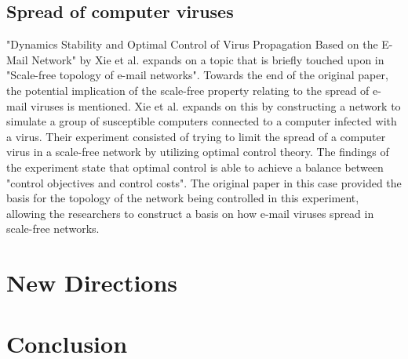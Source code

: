 \documentclass[a4paper]{article}
\begin{document}
\begin{multicols}{2}
\subsection{Spread of computer viruses}
\hspace*{\parindent}"Dynamics Stability and Optimal Control of Virus Propagation Based on the E-Mail Network" by Xie et al. \cite{5} expands on a topic that is briefly touched upon in "Scale-free topology of e-mail networks". Towards the end of the original paper, the potential implication of the scale-free property relating to the spread of e-mail viruses is mentioned. Xie et al. expands on this by constructing a network to simulate a group of susceptible computers connected to a computer infected with a virus. Their experiment consisted of trying to limit the spread of a computer virus in a scale-free network by utilizing optimal control theory. The findings of the experiment state that optimal control is able to achieve a balance between "control objectives and control costs". The original paper in this case provided the basis for the topology of the network being controlled in this experiment, allowing the researchers to construct a basis on how e-mail viruses spread in scale-free networks. 


\section{New Directions}
\hspace*{\parindent}

\section{Conclusion}
\hspace*{\parindent}

\end{multicols}

\newpage
\printbibliography %
\end{document}
